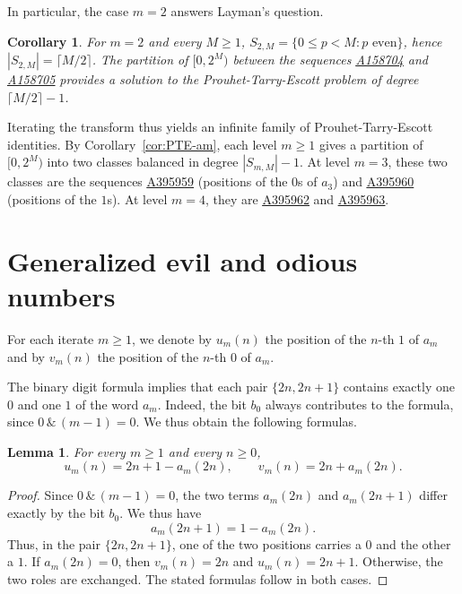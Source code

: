 \documentclass[12pt,reqno]{article}
\newcommand{\seqnum}[1]{\href{https://oeis.org/#1}{\rm \underline{#1}}}
\theoremstyle{plain}
\newtheorem{lemma}[theorem]{Lemma}
\newtheorem{corollary}[theorem]{Corollary}
\theoremstyle{definition}
\begin{document}
In particular, the case $m = 2$ answers Layman's question.

\begin{corollary}
\label{cor:PTE-Layman}
For $m = 2$ and every $M \ge 1$, $S_{2,M} = \{0 \le p < M : p \text{ even}\}$, hence $|S_{2,M}| = \lceil M/2 \rceil$. The partition of $[0, 2^M)$ between the sequences \seqnum{A158704} and \seqnum{A158705} provides a solution to the Prouhet-Tarry-Escott problem of degree $\lceil M/2 \rceil - 1$.
\end{corollary}

Iterating the transform thus yields an infinite family of Prouhet-Tarry-Escott identities. By Corollary~\ref{cor:PTE-am}, each level $m \ge 1$ gives a partition of $[0, 2^M)$ into two classes balanced in degree $|S_{m,M}|-1$. At level $m = 3$, these two classes are the sequences \seqnum{A395959} (positions of the $0$s of $a_3$) and \seqnum{A395960} (positions of the $1$s). At level $m = 4$, they are \seqnum{A395962} and \seqnum{A395963}.
\section{Generalized evil and odious numbers}
\label{sec:composition}

For each iterate $m \ge 1$, we denote by $u_m(n)$ the position of the $n$-th $1$ of $a_m$ and by $v_m(n)$ the position of the $n$-th $0$ of $a_m$.

The binary digit formula implies that each pair $\{2n,2n+1\}$ contains exactly one $0$ and one $1$ of the word $a_m$. Indeed, the bit $b_0$ always contributes to the formula, since $0\,\&\,(m-1)=0$. We thus obtain the following formulas.

\begin{lemma}
\label{lem:pairing-uv}
For every $m\ge 1$ and every $n\ge 0$,
\[
  u_m(n)=2n+1-a_m(2n),
  \qquad
  v_m(n)=2n+a_m(2n).
\]
\end{lemma}

\begin{proof}
Since $0\,\&\,(m-1)=0$, the two terms $a_m(2n)$ and $a_m(2n+1)$ differ exactly by the bit $b_0$. We thus have
\[
  a_m(2n+1)=1-a_m(2n).
\]
Thus, in the pair $\{2n,2n+1\}$, one of the two positions carries a $0$ and the other a $1$. If $a_m(2n)=0$, then $v_m(n)=2n$ and $u_m(n)=2n+1$. Otherwise, the two roles are exchanged. The stated formulas follow in both cases.
\end{proof}
\end{document}
